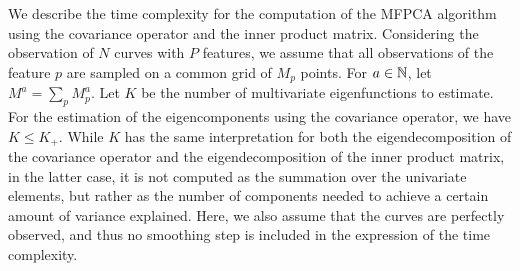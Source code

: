 We describe the time complexity for the computation of the MFPCA algorithm using the covariance operator and the inner product matrix. Considering the observation of $N$ curves with $P$ features, we assume that all observations of the feature $p$ are sampled on a common grid of $M_p$ points. For $a \in \mathbb{N}$, let $M^a = \sum_{p} M_p^a$. Let $K$ be the number of multivariate eigenfunctions to estimate. For the estimation of the eigencomponents using the covariance operator, we have $K \leq K_+$. While $K$ has the same interpretation for both the eigendecomposition of the covariance operator and the eigendecomposition of the inner product matrix, in the latter case, it is not computed as the summation over the univariate elements, but rather as the number of components needed to achieve a certain amount of variance explained. Here, we also assume that the curves are perfectly observed, and thus no smoothing step is included in the expression of the time complexity. 

